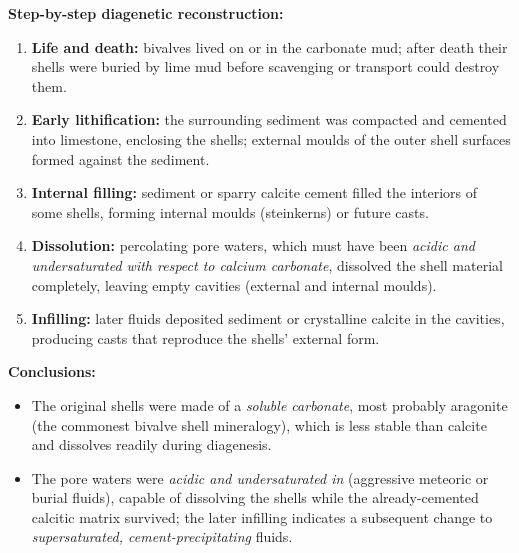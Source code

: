 \documentclass[11pt]{article}
\newcommand{\cle}[1]{{\popxbold\color{popdark}#1}}
\begin{document}
\begin{corrige}
\textbf{Step-by-step diagenetic reconstruction:}
\begin{enumerate}
\item \textbf{Life and death:} bivalves lived on or in the carbonate mud; after death their shells were buried by lime mud before scavenging or transport could destroy them.
\item \textbf{Early lithification:} the surrounding sediment was compacted and cemented into limestone, enclosing the shells; external moulds of the outer shell surfaces formed against the sediment.
\item \textbf{Internal filling:} sediment or sparry calcite cement filled the interiors of some shells, forming internal moulds (steinkerns) or future casts.
\item \textbf{Dissolution:} percolating pore waters, which must have been \emph{acidic and undersaturated with respect to calcium carbonate}, dissolved the shell material completely, leaving empty cavities (external and internal moulds).
\item \textbf{Infilling:} later fluids deposited sediment or crystalline calcite in the cavities, producing casts that reproduce the shells' external form.
\end{enumerate}
\textbf{Conclusions:}
\begin{itemize}
\item The original shells were made of a \emph{soluble carbonate}, most probably \cle{aragonite} (the commonest bivalve shell mineralogy), which is less stable than calcite and dissolves readily during diagenesis.
\item The pore waters were \emph{acidic and undersaturated in } (aggressive meteoric or burial fluids), capable of dissolving the shells while the already-cemented calcitic matrix survived; the later infilling indicates a subsequent change to \emph{supersaturated, cement-precipitating} fluids.
\end{itemize}
\end{corrige}
\end{document}
